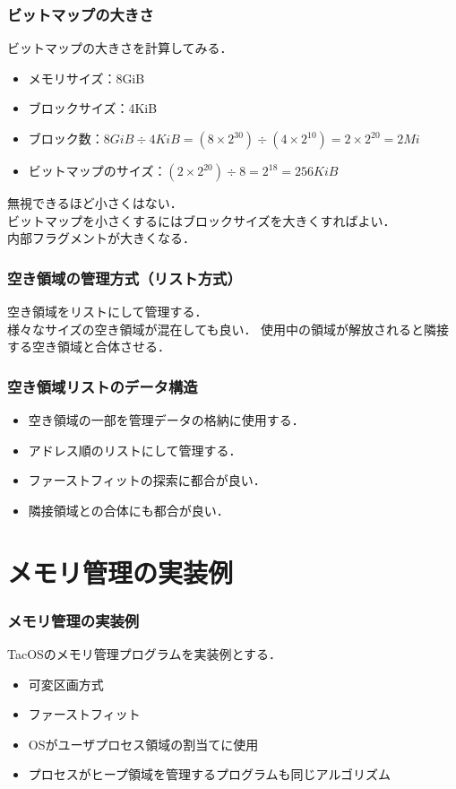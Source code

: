 \documentclass[handout]{beamer}                   %
\begin{document}
\begin{frame}
  \frametitle{ビットマップの大きさ}
  ビットマップの大きさを計算してみる．
  \begin{itemize}
  \item メモリサイズ：8GiB
  \item ブロックサイズ：4KiB
  \item ブロック数：$8GiB \div 4KiB = (8\times 2^{30}) \div (4 \times 2^{10})
    = 2 \times 2^{20} = 2Mi$
  \item ビットマップのサイズ：$(2 \times 2^{20}) \div 8 = 2^{18} = 256KiB$
  \end{itemize}
  無視できるほど小さくはない．\\
  ビットマップを小さくするにはブロックサイズを大きくすればよい．\\
  内部フラグメントが大きくなる．
\end{frame}

\begin{frame}
  \frametitle{空き領域の管理方式（リスト方式）}
  空き領域をリストにして管理する．\\
  様々なサイズの空き領域が混在しても良い．
  \vfill
  \vfill
  使用中の領域が解放されると隣接する空き領域と合体させる．
\end{frame}

\begin{frame}
  \frametitle{空き領域リストのデータ構造}
  \begin{itemize}
    \item 空き領域の一部を管理データの格納に使用する．
    \item アドレス順のリストにして管理する．
    \item ファーストフィットの探索に都合が良い．
    \item 隣接領域との合体にも都合が良い．
  \end{itemize}
\end{frame}

\section{メモリ管理の実装例}
\begin{frame}
  \frametitle{メモリ管理の実装例}
  TacOSのメモリ管理プログラムを実装例とする．
  \begin{itemize}
  \item 可変区画方式
  \item ファーストフィット
  \item OSがユーザプロセス領域の割当てに使用
  \item プロセスがヒープ領域を管理するプログラムも同じアルゴリズム
  \end{itemize}
\end{frame}
\end{document}
